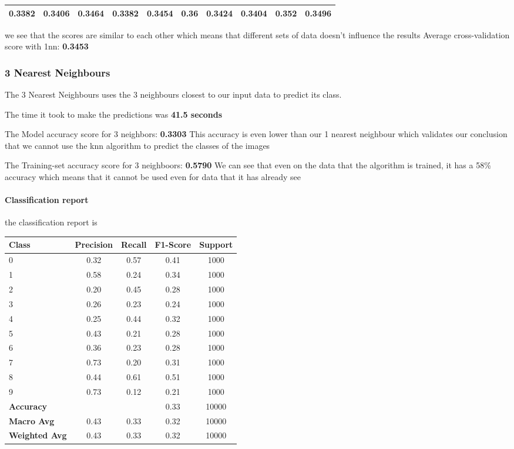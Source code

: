 \documentclass{article}
\begin{document}
\begin{tabular}{|c|c|c|c|c|c|c|c|c|c|}
\hline
0.3382 & 0.3406 & 0.3464 & 0.3382 & 0.3454 & 0.36   & 0.3424 & 0.3404 & 0.352  & 0.3496 \\
\hline
\end{tabular}

we see that the scores are similar to each other which means that different sets of data doesn't influence the results
Average cross-validation score with 1nn: \textbf{0.3453}
\subsubsection{3 Nearest Neighbours}
The 3 Nearest Neighbours uses the 3 neighbours closest to our input data to predict its class. 

The time it took to make the predictions was \textbf{41.5 seconds}

The Model accuracy score for 3 neighbors:\textbf{ 0.3303}
This accuracy is even lower than our 1 nearest neighbour which validates our conclusion that we cannot use the knn algorithm to predict the classes of the images 

The Training-set accuracy score for 3 neighboors:\textbf{ 0.5790}
We can see that even on the data that the algorithm is trained, it has a 58\% accuracy which means that it cannot be used even for data that it has already see 

\paragraph{Classification report}
the classification report is 

\begin{tabular}{lcccc}
\toprule
\textbf{Class} & \textbf{Precision} & \textbf{Recall} & \textbf{F1-Score} & \textbf{Support} \\
\midrule
0 & 0.32 & 0.57 & 0.41 & 1000 \\
1 & 0.58 & 0.24 & 0.34 & 1000 \\
2 & 0.20 & 0.45 & 0.28 & 1000 \\
3 & 0.26 & 0.23 & 0.24 & 1000 \\
4 & 0.25 & 0.44 & 0.32 & 1000 \\
5 & 0.43 & 0.21 & 0.28 & 1000 \\
6 & 0.36 & 0.23 & 0.28 & 1000 \\
7 & 0.73 & 0.20 & 0.31 & 1000 \\
8 & 0.44 & 0.61 & 0.51 & 1000 \\
9 & 0.73 & 0.12 & 0.21 & 1000 \\
\midrule
\textbf{Accuracy} & & & 0.33 & 10000 \\
\textbf{Macro Avg} & 0.43 & 0.33 & 0.32 & 10000 \\
\textbf{Weighted Avg} & 0.43 & 0.33 & 0.32 & 10000 \\
\bottomrule
\end{tabular}
\end{document}
